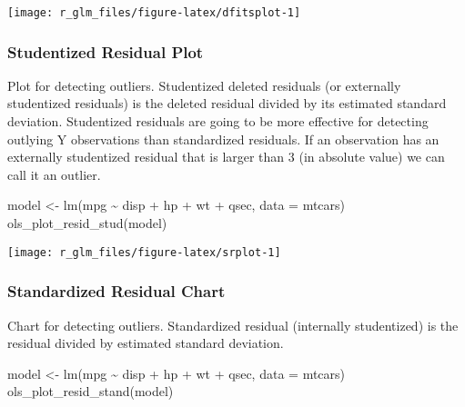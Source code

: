\documentclass[
]{article}
\newenvironment{Shaded}{\begin{snugshade}}{\end{snugshade}}
\newcommand{\AttributeTok}[1]{\textcolor[rgb]{0.77,0.63,0.00}{#1}}
\newcommand{\FunctionTok}[1]{\textcolor[rgb]{0.00,0.00,0.00}{#1}}
\newcommand{\NormalTok}[1]{#1}
\newcommand{\OtherTok}[1]{\textcolor[rgb]{0.56,0.35,0.01}{#1}}
\newcommand{\SpecialCharTok}[1]{\textcolor[rgb]{0.00,0.00,0.00}{#1}}
\begin{document}
\begin{center}\texttt{[image: r\_glm\_files/figure-latex/dfitsplot-1]} \end{center}

\hypertarget{studentized-residual-plot}{%
\subsubsection{Studentized Residual
Plot}\label{studentized-residual-plot}}

Plot for detecting outliers. Studentized deleted residuals (or
externally studentized residuals) is the deleted residual divided by its
estimated standard deviation. Studentized residuals are going to be more
effective for detecting outlying Y observations than standardized
residuals. If an observation has an externally studentized residual that
is larger than 3 (in absolute value) we can call it an outlier.

\begin{Shaded}
\begin{Highlighting}[]
\NormalTok{model }\OtherTok{\textless{}{-}} \FunctionTok{lm}\NormalTok{(mpg }\SpecialCharTok{\textasciitilde{}}\NormalTok{ disp }\SpecialCharTok{+}\NormalTok{ hp }\SpecialCharTok{+}\NormalTok{ wt }\SpecialCharTok{+}\NormalTok{ qsec, }\AttributeTok{data =}\NormalTok{ mtcars)}
\FunctionTok{ols\_plot\_resid\_stud}\NormalTok{(model)}
\end{Highlighting}
\end{Shaded}

\begin{center}\texttt{[image: r\_glm\_files/figure-latex/srplot-1]} \end{center}

\hypertarget{standardized-residual-chart}{%
\subsubsection{Standardized Residual
Chart}\label{standardized-residual-chart}}

Chart for detecting outliers. Standardized residual (internally
studentized) is the residual divided by estimated standard deviation.

\begin{Shaded}
\begin{Highlighting}[]
\NormalTok{model }\OtherTok{\textless{}{-}} \FunctionTok{lm}\NormalTok{(mpg }\SpecialCharTok{\textasciitilde{}}\NormalTok{ disp }\SpecialCharTok{+}\NormalTok{ hp }\SpecialCharTok{+}\NormalTok{ wt }\SpecialCharTok{+}\NormalTok{ qsec, }\AttributeTok{data =}\NormalTok{ mtcars)}
\FunctionTok{ols\_plot\_resid\_stand}\NormalTok{(model)}
\end{Highlighting}
\end{Shaded}
\end{document}
